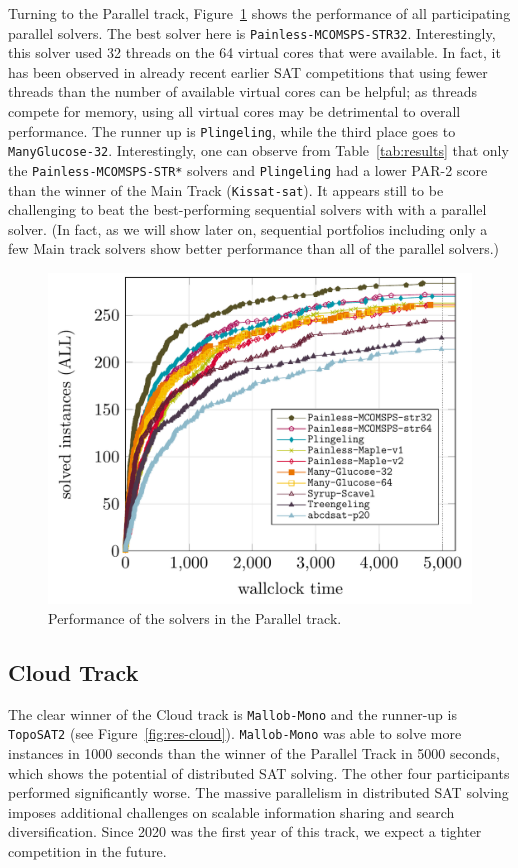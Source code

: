 \documentclass{elsarticle}
\newcommand{\solver}[1]{\texttt{#1}}
\begin{document}
Turning to the Parallel track, Figure~\ref{fig:res-parallel} shows the performance of
all participating parallel solvers. 
The best solver here is \solver{Painless-MCOMSPS-STR32}. Interestingly,
this solver used 32 threads on the 64 virtual cores that were available. In fact, it has been observed in already 
recent earlier 
SAT competitions that using fewer threads than the number of available virtual cores can be helpful; as threads compete 
for memory, using all virtual cores may be detrimental to  overall performance. The runner up is \solver{Plingeling}, while the
third place goes to \solver{ManyGlucose-32}. 
Interestingly, one can observe from Table~\ref{tab:results} that only the \solver{Painless-MCOMSPS-STR*} solvers
and \solver{Plingeling} had a lower PAR-2 score than the winner of the Main Track (\solver{Kissat-sat}). 
It appears still to be challenging to beat the best-performing sequential solvers with
with a parallel solver. (In fact, as we will show later on, sequential portfolios including only a few
Main track solvers show  better performance than all of the parallel solvers.)

\begin{figure}[ht]
\centering
\includegraphics[width=.9\textwidth]{img/parallel-ALL.pdf}
\caption{Performance of the solvers in the Parallel track.}
\label{fig:res-parallel}
\end{figure}

\subsection{Cloud Track}

The clear winner of the Cloud track is \solver{Mallob-Mono} and the runner-up is \solver{TopoSAT2}
(see Figure~\ref{fig:res-cloud}).
\solver{Mallob-Mono} was able to solve more instances in 1000 seconds than the 
winner of the Parallel Track in 5000 seconds, which shows the potential of distributed SAT solving. 
The other four participants performed significantly worse. 
The massive parallelism in distributed SAT solving imposes additional challenges on scalable information sharing and search diversification.
Since 2020 was the first year of this track, we expect a tighter competition in the future. 
\end{document}
